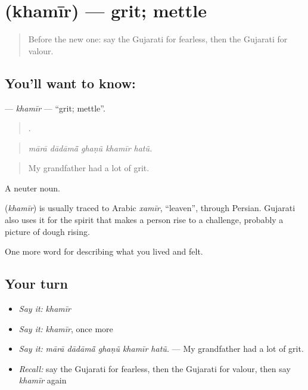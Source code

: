 \section[\texorpdfstring{\gu{ખમીર} (khamīr)}{ખમીર (khamīr)}]{ (khamīr) — grit; mettle}

\label{lesson:GU-C466-khamir}



\begin{quote}
Before the new one: say the Gujarati for fearless, then the Gujarati for valour.
\end{quote}

\subsection*{You'll want to know: }
\textbf{} — \emph{khamīr} — \textquotedblleft{}grit; mettle\textquotedblright{}.

\begin{quote}
    .
\end{quote}

\begin{quote}
\emph{mārā dādāmā̃ ghaṇũ khamīr hatũ.}
\end{quote}

\begin{quote}
My grandfather had a lot of grit.
\end{quote}

A neuter noun.

\begin{cousinweb}
\textbf{} (\emph{khamīr}) is usually traced to Arabic \emph{xamīr}, \textquotedblleft{}leaven\textquotedblright{}, through Persian. Gujarati also uses it for the spirit that makes a person rise to a challenge, probably a picture of dough rising.
\end{cousinweb}

\begin{grammarlens}[title={What you've built}]
One more word for describing what you lived and felt.
\end{grammarlens}

\subsection*{Your turn}
\begin{itemize}
\raggedright
  \item \emph{Say it:} \emph{khamīr}
  \item \emph{Say it:} \emph{khamīr}, once more
  \item \emph{Say it:} \emph{mārā dādāmā̃ ghaṇũ khamīr hatũ.} — My grandfather had a lot of grit.
  \item \emph{Recall:} say the Gujarati for fearless, then the Gujarati for valour, then say \emph{khamīr} again
\end{itemize}

